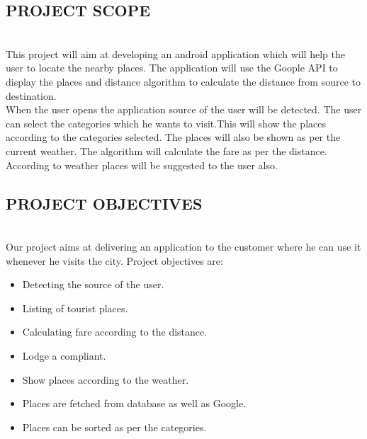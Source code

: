 \documentclass[12pt,a4paper]{article}
\begin{document}
\newpage
\pagestyle{plain} 
\begin{center}
\subsection{PROJECT SCOPE}
\end{center}
\\
\hspace{0.7 cm}This project will aim at developing an android application which will help the user to locate the nearby places. The application will use the Goople API to display the places and distance algorithm to calculate the distance from source to destination.
\\
\hspace{0.7 cm}When the user opens the application source of the user will be detected. The user can select the categories which he wants to visit.This will show the places according to the categories selected. The places will also be shown as per the current weather. The algorithm will calculate the fare as per the distance.
\\
\hspace{0.7 cm} According to weather places will be suggested to the user also.
\newpage
\pagestyle{plain} 
\begin{center}
\subsection{PROJECT OBJECTIVES}
\end{center}
\\
\hspace{0.7 cm}Our project aims at delivering an application to the customer where he can use it whenever he visits the city. Project objectives are:
\begin{itemize}
\item Detecting the source of the user.
\\
\item Listing of tourist places.
\\
\item Calculating fare according to the distance.
\\
\item Lodge a compliant.
\\
\item Show places according to the weather.
\\
\item Places are fetched from database as well as Google.
\\
\item Places can be sorted as per the categories.
\end{itemize}
\end{document}
